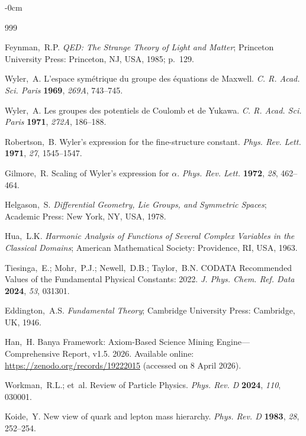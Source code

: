 \documentclass[entropy,article,submit,pdftex,oneauthor]{Definitions/mdpi}
\begin{document}
\begin{adjustwidth}{-\extralength}{0cm}


\begin{thebibliography}{999}

Feynman,~R.P. \textit{QED: The Strange Theory of Light and Matter}; Princeton University Press: Princeton, NJ, USA, 1985; p.~129.

Wyler,~A. L'espace sym\'{e}trique du groupe des \'{e}quations de Maxwell. \textit{C. R. Acad. Sci. Paris} \textbf{1969}, \textit{269A}, 743--745.

Wyler,~A. Les groupes des potentiels de Coulomb et de Yukawa. \textit{C. R. Acad. Sci. Paris} \textbf{1971}, \textit{272A}, 186--188.

Robertson,~B. Wyler's expression for the fine-structure constant. \textit{Phys. Rev. Lett.} \textbf{1971}, \textit{27}, 1545--1547.

Gilmore,~R. Scaling of Wyler's expression for $\alpha$. \textit{Phys. Rev. Lett.} \textbf{1972}, \textit{28}, 462--464.

Helgason,~S. \textit{Differential Geometry, Lie Groups, and Symmetric Spaces}; Academic Press: New York, NY, USA, 1978.

Hua,~L.K. \textit{Harmonic Analysis of Functions of Several Complex Variables in the Classical Domains}; American Mathematical Society: Providence, RI, USA, 1963.

Tiesinga,~E.; Mohr,~P.J.; Newell,~D.B.; Taylor,~B.N. CODATA Recommended Values of the Fundamental Physical Constants: 2022. \textit{J. Phys. Chem. Ref. Data} \textbf{2024}, \textit{53}, 031301.

Eddington,~A.S. \textit{Fundamental Theory}; Cambridge University Press: Cambridge, UK, 1946.

Han,~H. Banya Framework: Axiom-Based Science Mining Engine---Comprehensive Report, v1.5. 2026. Available online: \url{https://zenodo.org/records/19222015} (accessed on 8 April 2026).

Workman,~R.L.; et~al. Review of Particle Physics. \textit{Phys. Rev. D} \textbf{2024}, \textit{110}, 030001.

Koide,~Y. New view of quark and lepton mass hierarchy. \textit{Phys. Rev. D} \textbf{1983}, \textit{28}, 252--254.


\end{thebibliography}
\end{adjustwidth}
\end{document}
